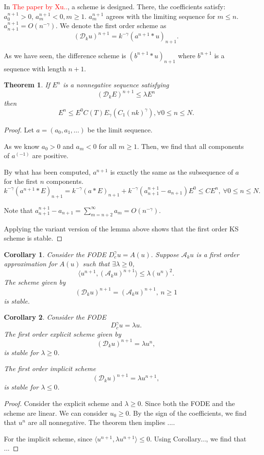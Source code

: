 \documentclass[11pt]{article}
\newcommand{\tcr}[1]{\textcolor{red}{#1}}
\newtheorem{thm}{Theorem}
\newtheorem{cor}{Corollary}
\begin{document}
In \tcr{The paper by Xu..}, a scheme is designed. There, the coefficients satisfy: $a_0^{n+1}>0$, $a_m^{n+1}<0, m\ge 1$. $a_m^{n+1}$ agrees with the limiting sequence for $m\le n$. $a_{n+1}^{n+1}=O(n^{-\gamma})$. We denote the first order scheme as $$
(\mathscr{D}_ku)^{n+1}=k^{-\gamma}(a^{n+1}*u)_{n+1}.
$$

As we have seen, the difference scheme is $(b^{n+1}*u)_{n+1}$ where $b^{n+1}$ is a sequence with length $n+1$. 

\begin{thm}
If $E^n$ is a nonnegative sequence satisfying $$
(\mathscr{D}_kE)^{n+1}\le \lambda E^n
$$
then $$
E^n\le E^0 C(T)E_{\gamma}(C_1(nk)^{\gamma}), \forall 0\le n\le N.
$$
\end{thm}

\begin{proof}
Let $a=(a_0, a_1,\ldots)$ be the limit sequence.

As we know $a_0>0$ and $a_m<0$ for all $m\ge 1$. Then, we find that all components of $a^{(-1)}$ are positive.

By what has been computed, $a^{n+1}$ is exactly the same as the subsequence of $a$ for the first $n$ components. $$
k^{-\gamma}(a^{n+1}*E)_{n+1}=k^{-\gamma}(a*E)_{n+1}+k^{-\gamma}(a_{n+1}^{n+1}-a_{n+1})E^0\le CE^{n},\ \forall 0\le n\le N.
$$

Note that $a_{n+1}^{n+1}-a_{n+1}=\sum_{m=n+2}^{\infty}a_m=O(n^{-\gamma})$.

Applying the variant version of the lemma above shows that the first order KS scheme is stable.
\end{proof}

\begin{cor}
Consider the FODE $D_c^{\gamma}u=A(u)$. Suppose $\mathscr{A}_ku$ is a first order approximation for $A(u)$ such that $\exists\lambda\ge 0$, $$
\langle u^{n+1}, (\mathscr{A}_ku)^{n+1}\rangle\le \lambda(u^{n})^2.
$$
The scheme given by
$$
(\mathcal{D}_ku)^{n+1}=(\mathscr{A}_ku)^{n+1}, \ n\ge 1
$$
is stable.
\end{cor}

\begin{cor}
Consider the FODE $$
D_c^{\gamma}u=\lambda u.
$$
The first order explicit scheme given by $$
(\mathscr{D}_ku)^{n+1}=\lambda u^n,
$$
is stable for $\lambda\ge 0$.

The first order implicit scheme 
$$
(\mathscr{D}_ku)^{n+1}=\lambda u^{n+1},
$$
is stable for $\lambda\le 0$.
\end{cor}
\begin{proof}
Consider the explicit scheme and $\lambda\ge 0$. Since both the FODE and the scheme are linear. We can consider $u_0\ge 0$.
By the sign of the coefficients, we find that $u^n$ are all nonnegative.
The theorem then implies ....

For the implicit scheme, since $\langle u^{n+1}, \lambda u^{n+1}\rangle\le 0$. Using Corollary..., we find that ...
\end{proof}
\end{document}
